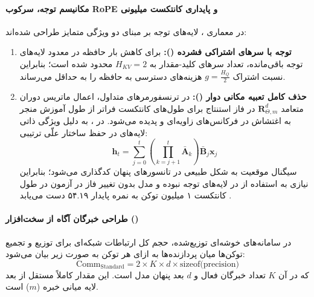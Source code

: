 \paragraph*{مکانیسم توجه، سرکوب RoPE و پایداری کانتکست میلیونی}
در معماری ، لایه‌های توجه بر مبنای دو ویژگی متمایز طراحی شده‌اند:
\begin{enumerate}
    \item \textbf{توجه با سرهای اشتراکی فشرده ():} برای کاهش بار حافظه در معدود لایه‌های توجه باقی‌مانده، تعداد سرهای کلید-مقدار به $H_{KV} = 2$ محدود شده است؛ بنابراین نسبت اشتراک $g = \frac{H_Q}{2}$ هزینه‌های دسترسی به حافظه را به حداقل می‌رساند.
    \item \textbf{حذف کامل تعبیه مکانی دوار ():} در ترنسفورمرهای متداول، اعمال ماتریس دوران متعامد $\mathbf{R}_{\Theta, m}^d$ در فاز استنتاج برای طول‌های کانتکست فراتر از طول آموزش منجر به اغتشاش در فرکانس‌های زاویه‌ای و پدیده  می‌شود. در ، به دلیل ویژگی ذاتی لایه‌های  در حفظ ساختار علّی ترتیبی:
    \begin{equation}
        \mathbf{h}_t = \sum_{j=0}^t \left( \prod_{k=j+1}^t \bar{\mathbf{A}}_k \right) \bar{\mathbf{B}}_j \mathbf{x}_j
    \end{equation}
    سیگنال موقعیت به شکل طبیعی در تانسورهای پنهان کدگذاری می‌شود؛ بنابراین نیازی به استفاده از  در لایه‌های توجه نبوده و مدل بدون تغییر فاز در آزمون  در طول کانتکست ۱ میلیون توکن به نمره پایدار ۵۴.۱۹ دست می‌یابد \cite{hsieh2024ruler, puvvada2025swan}.
\end{enumerate}

\paragraph*{طراحی خبرگان آگاه از سخت‌افزار ()}
در سامانه‌های خوشه‌ای توزیع‌شده، حجم کل ارتباطات شبکه‌ای  برای توزیع و تجمیع توکن‌ها میان پردازنده‌ها به ازای هر توکن به صورت زیر بیان می‌شود:
\begin{equation}
    \text{Comm}_{\text{Standard}} = 2 \times K \times d \times \text{sizeof(precision)}
\end{equation}
که در آن $K$ تعداد خبرگان فعال و $d$ بعد پنهان مدل است. این مقدار کاملاً مستقل از بعد لایه میانی خبره ($m$) است. 

